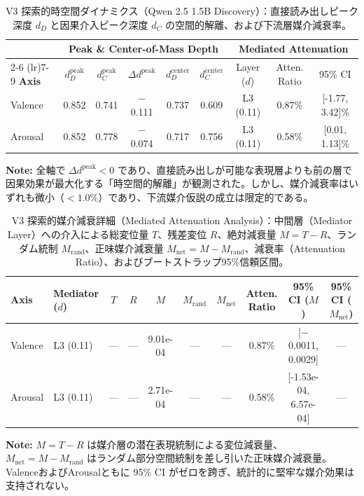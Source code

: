 \begin{table}[htbp]
\centering
\small
\caption{V3 探索的時空間ダイナミクス（Qwen 2.5 1.5B Discovery）：直接読み出しピーク深度 $d_D$ と因果介入ピーク深度 $d_C$ の空間的解離、および下流層媒介減衰率。}
\label{tab:v3_spatiotemporal_dynamics}
\begin{tabular}{l ccccc ccc}
\toprule
 & \multicolumn{5}{c}{\textbf{Peak \& Center-of-Mass Depth}} & \multicolumn{3}{c}{\textbf{Mediated Attenuation}} \\
\cmidrule(lr){2-6} \cmidrule(lr){7-9}
\textbf{Axis} & $d_D^{\text{peak}}$ & $d_C^{\text{peak}}$ & $\Delta d^{\text{peak}}$ & $d_D^{\text{center}}$ & $d_C^{\text{center}}$ & Layer ($d$) & Atten. Ratio & 95\% CI \\
\midrule
Valence    & 0.852    & 0.741    & $-$0.111 & 0.737    & 0.609    & L3 (0.11)    & 0.87\%       & [-1.77, 3.42]\% \\
Arousal    & 0.852    & 0.778    & $-$0.074 & 0.717    & 0.756    & L3 (0.11)    & 0.58\%       & [0.01, 1.13]\% \\
\bottomrule
\end{tabular}
\vspace{1ex}
\begin{minipage}{\linewidth}
\footnotesize
\textbf{Note:} 全軸で $\Delta d^{\text{peak}} < 0$ であり、直接読み出しが可能な表現層よりも前の層で因果効果が最大化する「時空間的解離」が観測された。しかし、媒介減衰率はいずれも微小（$< 1.0\%$）であり、下流媒介仮説の成立は限定的である。
\end{minipage}
\end{table}

\begin{table}[htbp]
\centering
\small
\caption{V3 探索的媒介減衰詳細（Mediated Attenuation Analysis）：中間層（Mediator Layer）への介入による総変位量 $T$、残差変位 $R$、絶対減衰量 $M = T - R$、ランダム統制 $M_{\text{rand}}$、正味媒介減衰量 $M_{\text{net}} = M - M_{\text{rand}}$、減衰率（Attenuation Ratio）、およびブートストラップ95\%信頼区間。}
\label{tab:v3_mediated_attenuation}
\begin{tabular}{ll cccccc cc}
\toprule
\textbf{Axis} & \textbf{Mediator ($d$)} & $T$ & $R$ & $M$ & $M_{\text{rand}}$ & $M_{\text{net}}$ & \textbf{Atten. Ratio} & \textbf{95\% CI ($M$)} & \textbf{95\% CI ($M_{\text{net}}$)} \\
\midrule
Valence    & L3 (0.11)        & ---      & ---      & 9.01e-04   & ---        & ---        & 0.87\%         & [$-$0.0011, 0.0029]    & --- \\
Arousal    & L3 (0.11)        & ---      & ---      & 2.71e-04   & ---        & ---        & 0.58\%         & [-1.53e-04, 6.57e-04]  & --- \\
\bottomrule
\end{tabular}
\vspace{1ex}
\begin{minipage}{\linewidth}
\footnotesize
\textbf{Note:} $M = T - R$ は媒介層の潜在表現統制による変位減衰量、$M_{\text{net}} = M - M_{\text{rand}}$ はランダム部分空間統制を差し引いた正味媒介減衰量。ValenceおよびArousalともに 95\% CI がゼロを跨ぎ、統計的に堅牢な媒介効果は支持されない。
\end{minipage}
\end{table}

